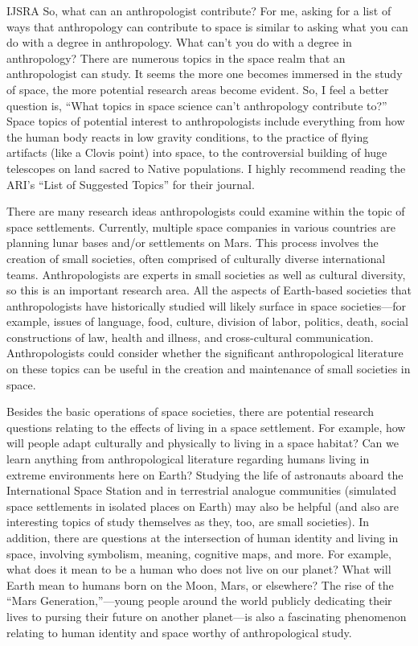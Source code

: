 \begin{labeling}{IJSRA}
	So, what can an anthropologist contribute? For me, asking for a list of ways that anthropology can contribute to space is similar to asking what you can do with a degree in anthropology. What can’t you do with a degree in anthropology? There are numerous topics in the space realm that an anthropologist can study. It seems the more one becomes immersed in the study of space, the more potential research areas become evident. So, I feel a better question is, “What topics in space science can’t anthropology contribute to?” Space topics of potential interest to anthropologists include everything from how the human body reacts in low gravity conditions, to the practice of flying artifacts (like a Clovis point) into space, to the controversial building of huge telescopes on land sacred to Native populations. I highly recommend reading the ARI's “List of Suggested Topics” for their journal.

	There are many research ideas anthropologists could examine within the topic of space settlements. Currently, multiple space companies in various countries are planning lunar bases and/or settlements on Mars. This process involves the creation of small societies, often comprised of culturally diverse international teams. Anthropologists are experts in small societies as well as cultural diversity, so this is an important research area. All the aspects of Earth-based societies that anthropologists have historically studied will likely surface in space societies—for example, issues of language, food, culture, division of labor, politics, death, social constructions of law, health and illness, and cross-cultural communication. Anthropologists could consider whether the significant anthropological literature on these topics can be useful in the creation and maintenance of small societies in space.

	Besides the basic operations of space societies, there are potential research questions relating to the effects of living in a space settlement. For example, how will people adapt culturally and physically to living in a space habitat? Can we learn anything from anthropological literature regarding humans living in extreme environments here on Earth? Studying the life of astronauts aboard the International Space Station and in terrestrial analogue communities (simulated space settlements in isolated places on Earth) may also be helpful (and also are interesting topics of study themselves as they, too, are small societies). In addition, there are questions at the intersection of human identity and living in space, involving symbolism, meaning, cognitive maps, and more. For example, what does it mean to be a human who does not live on our planet? What will Earth mean to humans born on the Moon, Mars, or elsewhere? The rise of the “Mars Generation,”—young people around the world publicly dedicating their lives to pursing their future on another planet—is also a fascinating phenomenon relating to human identity and space worthy of anthropological study.


\end{labeling}
